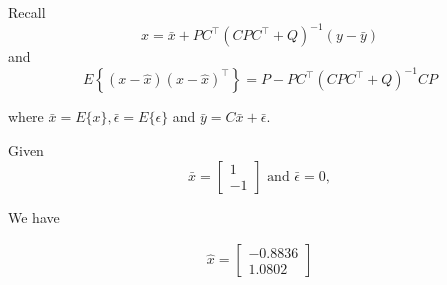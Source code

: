\documentclass{article}
\theoremstyle{definition} %
\begin{document}
\section{}
Recall 
$$\widehat{x}=\bar{x}+P C^{\top}\left(C P C^{\top}+Q\right)^{-1}(y-\bar{y})$$ 
and 
$$E\left\{(x-\hat{x})(x-\hat{x})^{\top}\right\}=P-P C^{\top}\left(C P C^{\top}+Q\right)^{-1} C P$$ 

where $\bar{x}=E\{x\}, \bar{\epsilon}=E\{\epsilon\}$ and $\bar{y}=C \bar{x}+\bar{\epsilon}$. 

Given
$$
\bar{x}=\left[\begin{array}{r}
1 \\
-1
\end{array}\right] \text { and } \bar{\epsilon}=0,
$$

We have 

\begin{align*}
    \hat x =
    \begin{bmatrix}
        -0.8836\\
        1.0802
    \end{bmatrix}
\end{align*}
\end{document}
